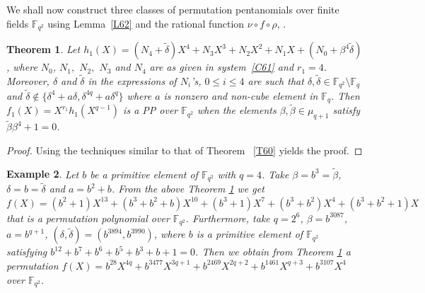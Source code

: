 \documentclass[12pt]{amsart}
\newtheorem{thm}{Theorem}[section]
\newtheorem{exmp}[thm]{Example}
\numberwithin{equation}{section}
\theoremstyle{definition}
\newcommand{\F}{\mathbb F}
\begin{document}
We shall now construct three classes of permutation pentanomials over finite fields $\F_{q^2}$ using Lemma~\ref{L62} and the rational function $\nu \circ f \circ \rho$, .
\begin{thm}\label{T65}
Let $h_1(X)=(N_4+{\tilde \delta}) X^4+N_3X^3+N_2X^2+N_1X+(N_0 + \beta^4{\tilde \delta})$, where $N_0$, $N_1,$ $N_2,$ $N_3$ and $N_4$ are as given in system~\eqref{C61} and $r_1=4$. Moreover, $\delta$ and $\tilde \delta$ in the expressions of $N_i$'s, $0 \leq i \leq 4$ are such that $\delta, \tilde \delta \in \F_{q^2}\setminus\F_{q}$ and $\tilde \delta \not \in \{ \delta^4+a \delta, \delta^{4q}+a \delta^q\}$ where $a$ is nonzero and non-cube element in $\F_q$.
Then $f_1(X)=X^{r_1}h_1(X^{q-1})$ is a PP over $\F_{q^2}$ when the elements $\beta, \tilde{\beta} \in \mu_{q+1}$ satisfy ${\tilde \beta}\beta^4+1=0$.
\end{thm}

\begin{proof} Using the techniques similar to that of Theorem ~\ref{T60} yields the proof.
\end{proof}

\begin{exmp}\label{EX42}
Let $b$ be a primitive element of $\F_{q^2}$ with $q=4$. Take $\beta=b^3=\tilde{\beta}$, $\delta=b=\tilde{\delta}$ and $a=b^2+b$. From the above Theorem \ref{T65}
we get $f(X)=(b^2+1)X^{13}+(b^3+b^2+b)X^{10}+(b^3+1)X^7+(b^3+b^2)X^4+(b^3+b^2+1)X$ that is a permutation polynomial over $\F_{q^2}$. Furthermore, take $q=2^6$, $\beta=b^{3087}$, $a = b^{q+1}$, $(\delta, \tilde{\delta})=(b^{3894}, b^{3990})$, where $b$ is a primitive element of $\F_{q^2}$ satisfying $b^{12}+b^7+b^6+b^5+b^3+b+1=0$.
Then we obtain from Theorem \ref{T65} a permutation $f(X) = b^{28}X^{4q} +b^{3477}X^{3q+1} + b^{2469}X^{2q+2} + b^{1461}X^{q+3} + b^{3107}X^4$ over $\F_{q^2}$.
\end{exmp}
\end{document}
